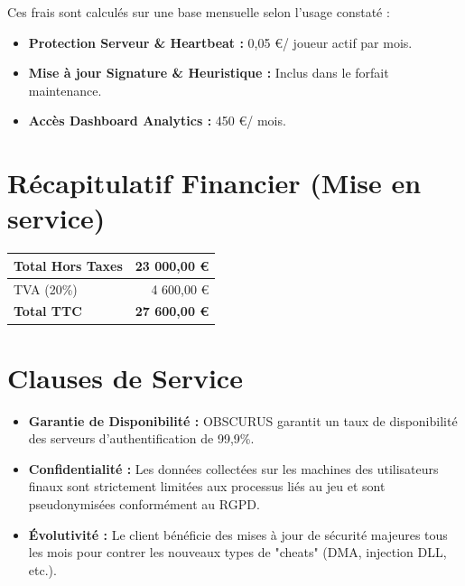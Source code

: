 \documentclass[a4paper,11pt]{article}
\begin{document}
Ces frais sont calculés sur une base mensuelle selon l'usage constaté :
\begin{itemize}
    \item \textbf{Protection Serveur \& Heartbeat :} 0,05 \euro / joueur actif par mois.
    \item \textbf{Mise à jour Signature \& Heuristique :} Inclus dans le forfait maintenance.
    \item \textbf{Accès Dashboard Analytics :} 450 \euro / mois.
\end{itemize}

\section{Récapitulatif Financier (Mise en service)}

\begin{flushright}
\begin{tabular}{|l|r|}
\hline
Total Hors Taxes & 23 000,00 \euro \\
\hline
TVA (20\%) & 4 600,00 \euro \\
\hline
\textbf{Total TTC} & \textbf{27 600,00 \euro} \\
\hline
\end{tabular}
\end{flushright}

\section{Clauses de Service}

\begin{itemize}
    \item \textbf{Garantie de Disponibilité :} OBSCURUS garantit un taux de disponibilité des serveurs d'authentification de 99,9\%.
    \item \textbf{Confidentialité :} Les données collectées sur les machines des utilisateurs finaux sont strictement limitées aux processus liés au jeu et sont pseudonymisées conformément au RGPD.
    \item \textbf{Évolutivité :} Le client bénéficie des mises à jour de sécurité majeures tous les mois pour contrer les nouveaux types de "cheats" (DMA, injection DLL, etc.).
\end{itemize}
\end{document}
